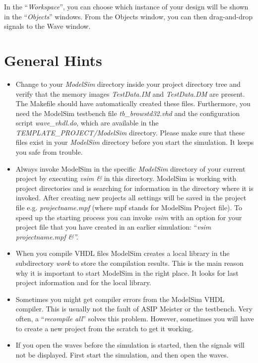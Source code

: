 In the ``\emph{Workspace}'', you can choose which instance of your
design will be shown in the ``\emph{Objects}'' windows. From the Objects
window, you can then drag-and-drop signals to the Wave window.
\hypertarget{general-hints}{%
\section{General Hints}\label{general-hints}}
\begin{itemize}
\item
  Change to your \emph{ModelSim} directory inside your project directory
  tree and verify that the memory images \emph{TestData.IM} and
  \emph{TestData.DM} are present. The Makefile should have automatically
  created these files. Furthermore, you need the ModelSim testbench file
  \emph{tb\_browstd32.vhd} and the configuration script
  \emph{wave\_vhdl.do}, which are available in the
  \emph{TEMPLATE\_PROJECT/ModelSim} directory. Please make sure that
  these files exist in your \emph{ModelSim} directory before you start
  the simulation. It keeps you safe from trouble.
\item
  Always invoke ModelSim in the specific \emph{ModelSim} directory of
  your current project by executing \emph{vsim \&} in this directory.
  ModelSim is working with project directories and is searching for
  information in the directory where it is invoked. After creating new
  projects all settings will be saved in the project file e.g.
  \emph{projectname.mpf} (where mpf stands for ModelSim Project file).
  To speed up the starting process you can invoke \emph{vsim} with an
  option for your project file that you have created in an earlier
  simulation: ``\emph{vsim projectname.mpf \&''.}
\item
  When you compile VHDL files ModelSim creates a local library in the
  subdirectory \emph{work} to store the compilation results. This is the
  main reason why it is important to start ModelSim in the right place.
  It looks for last project information and for the local library.
\item
  Sometimes you might get compiler errors from the ModelSim VHDL
  compiler. This is usually not the fault of ASIP Meister or the
  testbench. Very often, a ``\emph{recompile all}'' solves this problem.
  However, sometimes you will have to create a new project from the
  scratch to get it working.
\item
  If you open the waves before the simulation is started, then the
  signals will not be displayed. First start the simulation, and then
  open the waves.
\end{itemize}
